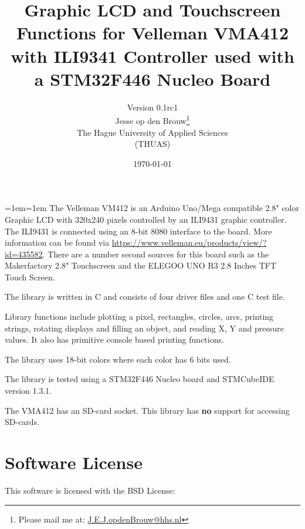 \documentclass[12pt]{article}
\author{Version 0.1rc1\\[2ex]Jesse op den Brouw\thanks{Please mail me at: \href{mailto:J.E.J.opdenBrouw@hhs.nl}{J.E.J.opdenBrouw@hhs.nl}}\\The Hague University of Applied Sciences\\(THUAS)}
\title{Graphic LCD and Touchscreen Functions for Velleman VMA412 with ILI9341 Controller used with a STM32F446 Nucleo Board}
\date{\today}
\begin{document}
\raggedbottom
\maketitle

\vfill
{\small\leftskip=1em\rightskip=1em
The Velleman VM412 is an Arduino Uno/Mega compatible 2.8" color Graphic LCD with 320x240 pixels controlled by an ILI9431 graphic controller. The ILI9431 is connected using an 8-bit 8080 interface to the board. More information can be found via \url{https://www.velleman.eu/products/view/?id=435582}. There are a number second sources for this board such as the Makerfactory 2.8" Touchscreen and the ELEGOO UNO R3 2.8 Inches TFT Touch Screen.

The library is written in C and consists of four driver files and one C test file.

Library functions include plotting a pixel, rectangles, circles, arcs, printing strings, rotating displays and filling an object, and reading X, Y and pressure values. It also has primitive console based printing functions.

The library uses 18-bit colors where each color has 6 bits used.

The library is tested using a STM32F446 Nucleo board and STMCubeIDE version 1.3.1.

The VMA412 has an SD-card socket. This library has \textbf{no} support for accessing SD-cards.

}
\vfill

\newpage

\tableofcontents


\newpage

\section{Software License}
This software is licensed with the BSD License:
\end{document}
